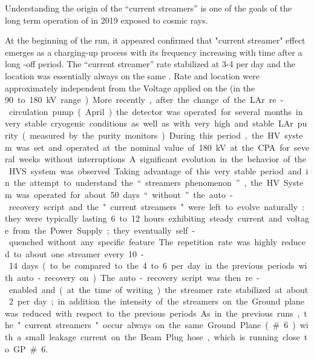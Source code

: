 Understanding the origin of the ``current streamers'' is one of the goals of the long term operation of  in 2019 exposed to cosmic rays.


At the beginning of the run, it appeared confirmed that "current streamer" effect emerges as a charging-up process with its frequency increasing with time after a long -off period. The ``current streamer'' rate stabilized at 3-4 per day and the location was essentially always on the same . Rate and location were approximately independent from the Voltage applied on the  (in the \SI{90} to \SI{180}{\kV} range).

More recently, after the change of the LAr re-circulation pump (April) the detector was operated for several months in very stable cryogenic conditions as well as with very high and stable LAr purity (measured by the purity monitors). During this period, the HV system was set and operated at the nominal value of 180 kV at the CPA for several weeks without interruptions. A significant evolution in the behavior of the HVS system was observed.

Taking advantage of this very stable period and in the attempt to understand the “streamers phenomenon”, the HV System was operated for about 50 days “without” the auto-recovery script and the "current streamers" were left to evolve naturally: they were typically lasting 6 to 12 hours exhibiting steady current and voltage from the Power Supply; they eventually self-quenched without any specific feature. The repetition rate was highly reduced to  about one streamer every 10-14 days (to be compared to the  ~4 to 6 per day in the previous periods with auto-recovery on).

The auto-recovery script was then re-enabled and (at the time of writing) the streamer rate  stabilized at about 2 per day; in addition the intensity of the streamers on the Ground plane was reduced with respect to the previous periods. As in the previous runs, the "current streamers" occur always on the same Ground Plane (\#6) with a small leakage current on the Beam Plug hose, which is running close to GP\#6.

